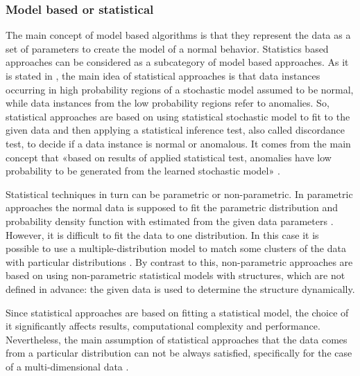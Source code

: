\subsubsection{Model based \cite{article:6_survey_anom_det_rtuvs}\cite{inproceedings:18_ardod_lstd} or statistical \cite{article:15_survey_ad}}
The main concept of model based algorithms is that they represent the data as a set of parameters to create the model of a normal behavior. Statistics based approaches can be considered as a subcategory of model based approaches. As it is stated in \cite{article:15_survey_ad}, the main idea of statistical approaches is that data instances occurring in high probability regions of a stochastic model assumed to be normal, while data instances from the low probability regions refer to anomalies. So, statistical approaches are based on using statistical stochastic model to fit to the given data and then applying a statistical inference test, also called discordance test, to decide if a data instance is normal or anomalous. It comes from the main concept that «based on results of applied statistical test, anomalies have low probability to be generated from the learned stochastic model» \cite{article:15_survey_ad}.

Statistical techniques in turn can be parametric or non-parametric. In parametric approaches the normal data is supposed to fit the parametric distribution and probability density function with estimated from the given data parameters \cite{article:6_survey_anom_det_rtuvs}. However, it is difficult to fit the data to one distribution. In this case it is possible to use a multiple-distribution model to match some clusters of the data with particular distributions \cite{inproceedings:18_ardod_lstd}. By contrast to this, non-parametric approaches are based on using non-parametric statistical models with structures, which are not defined in advance: the given data is used to determine the structure dynamically.

Since statistical approaches are based on fitting a statistical model, the choice of it significantly affects results, computational complexity and performance. Nevertheless, the main assumption of statistical approaches that the data comes from a particular distribution can not be always satisfied, specifically for the case of a multi-dimensional data \cite{article:15_survey_ad}.

